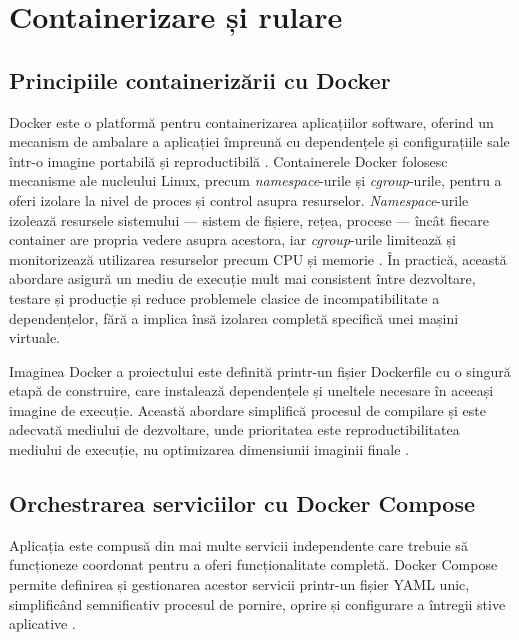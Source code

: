 \documentclass[12pt, a4paper, oneside, romanian]{teza-upb}
\begin{document}
\section{Containerizare și rulare}

\subsection{Principiile containerizării cu Docker}

Docker este o platformă pentru containerizarea aplicațiilor software, 
oferind un mecanism de ambalare a aplicației împreună cu dependențele 
și configurațiile sale într-o imagine portabilă și reproductibilă 
\cite{docker_doc}. Containerele Docker folosesc mecanisme ale nucleului Linux, precum \textit{namespace}-urile și \textit{cgroup}-urile, pentru a oferi izolare la nivel de proces și control asupra resurselor. \textit{Namespace}-urile izolează resursele sistemului — sistem de fișiere, rețea, procese — încât fiecare container are propria 
vedere asupra acestora, iar \textit{cgroup}-urile limitează și monitorizează utilizarea 
resurselor precum CPU și memorie \cite{docker_doc}. În practică, această abordare asigură un mediu de execuție mult mai consistent între dezvoltare, testare și producție și reduce problemele clasice de incompatibilitate a dependențelor, fără a implica însă izolarea completă specifică unei mașini virtuale.

Imaginea Docker a proiectului este definită printr-un fișier Dockerfile cu o singură etapă de construire, care instalează dependențele și uneltele necesare în aceeași imagine de execuție. Această abordare simplifică procesul de compilare și este adecvată mediului de dezvoltare, unde prioritatea este reproductibilitatea mediului de execuție, nu optimizarea dimensiunii imaginii finale \cite{docker_doc}.


\subsection{Orchestrarea serviciilor cu Docker Compose}

Aplicația este compusă din mai multe servicii independente care trebuie să funcționeze coordonat pentru a oferi funcționalitate completă. Docker Compose permite definirea și gestionarea acestor servicii printr-un fișier YAML unic, simplificând semnificativ procesul de pornire, oprire și configurare a întregii stive aplicative \cite{docker_compose_doc}.
\end{document}
